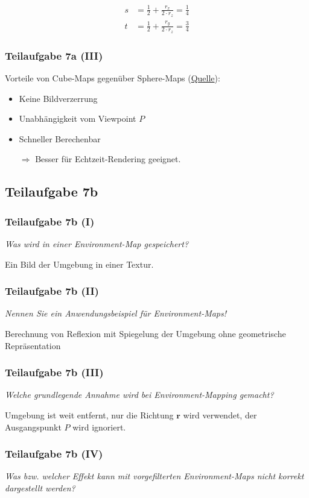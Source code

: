 \documentclass[a4paper]{scrartcl}
\begin{document}
\begin{align}
    s &= \frac{1}{2} + \frac{r_x}{2 \cdot r_z} = \frac{1}{4}\\
    t &= \frac{1}{2} + \frac{r_y}{2 \cdot r_z} = \frac{3}{4}
\end{align}

\subsubsection*{Teilaufgabe 7a (III)}
Vorteile von Cube-Maps gegenüber Sphere-Maps (\href{https://en.wikipedia.org/wiki/Cube_mapping}{Quelle}):
\begin{itemize}
    \item Keine Bildverzerrung
    \item Unabhängigkeit vom Viewpoint $P$
    \item Schneller Berechenbar
    \item[$\Rightarrow$] Besser für Echtzeit-Rendering geeignet.
\end{itemize}


\subsection*{Teilaufgabe 7b}
\subsubsection*{Teilaufgabe 7b (I)}
\textit{Was wird in einer Environment-Map gespeichert?}

Ein Bild der Umgebung in einer Textur.

\subsubsection*{Teilaufgabe 7b (II)}
\textit{Nennen Sie ein Anwendungsbeispiel für Environment-Maps!}

Berechnung von Reflexion mit Spiegelung der Umgebung ohne geometrische Repräsentation

\subsubsection*{Teilaufgabe 7b (III)}
\textit{Welche grundlegende Annahme wird bei Environment-Mapping gemacht?}

Umgebung ist weit entfernt, nur die Richtung $\mathbf{r}$ wird verwendet, der Ausgangspunkt $P$ wird ignoriert.

\subsubsection*{Teilaufgabe 7b (IV)}
\textit{Was bzw. welcher Effekt kann mit vorgefilterten Environment-Maps nicht korrekt dargestellt werden?}
\end{document}
